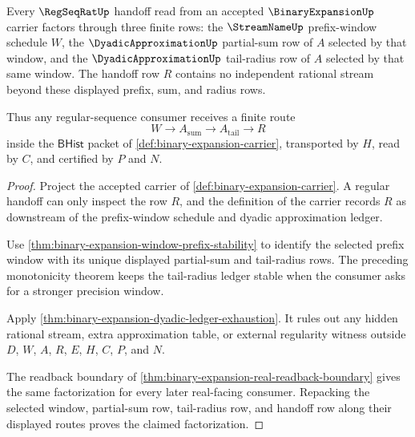 \begin{theorem}
\label{thm:binary-expansion-regular-handoff-factorization}
Every $\RegSeqRatUp$ handoff read from an accepted $\BinaryExpansionUp$ carrier factors through three finite rows: the $\StreamNameUp$ prefix-window schedule $W$, the $\DyadicApproximationUp$ partial-sum row of $A$ selected by that window, and the $\DyadicApproximationUp$ tail-radius row of $A$ selected by that same window. The handoff row $R$ contains no independent rational stream beyond these displayed prefix, sum, and radius rows.

Thus any regular-sequence consumer receives a finite route
$$
W \longrightarrow A_{\mathrm{sum}} \longrightarrow A_{\mathrm{tail}} \longrightarrow R
$$
inside the $\mathsf{BHist}$ packet of \autoref{def:binary-expansion-carrier}, transported by $H$, read by $C$, and certified by $P$ and $N$.
\end{theorem}
\begin{proof}
Project the accepted carrier of \autoref{def:binary-expansion-carrier}. A regular handoff can only inspect the row $R$, and the definition of the carrier records $R$ as downstream of the prefix-window schedule and dyadic approximation ledger.

Use \autoref{thm:binary-expansion-window-prefix-stability} to identify the selected prefix window with its unique displayed partial-sum and tail-radius rows. The preceding monotonicity theorem keeps the tail-radius ledger stable when the consumer asks for a stronger precision window.

Apply \autoref{thm:binary-expansion-dyadic-ledger-exhaustion}. It rules out any hidden rational stream, extra approximation table, or external regularity witness outside $D$, $W$, $A$, $R$, $E$, $H$, $C$, $P$, and $N$.

The readback boundary of \autoref{thm:binary-expansion-real-readback-boundary} gives the same factorization for every later real-facing consumer. Repacking the selected window, partial-sum row, tail-radius row, and handoff row along their displayed routes proves the claimed factorization.
\end{proof}

